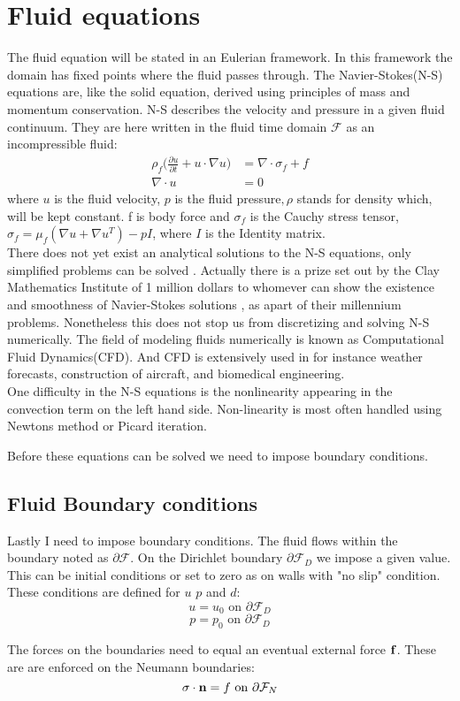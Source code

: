 
\section{Fluid equations}
The fluid equation will be stated in an Eulerian framework. In this framework the domain has fixed points where the fluid passes through. 
The Navier-Stokes(N-S) equations are, like the solid equation, derived using principles of mass and momentum conservation. N-S describes the velocity and pressure in a given fluid continuum. They are here written in the fluid time domain $\mathcal{F}$ as an incompressible fluid:
\begin{align}
\label{eq:NS}
\rho_f\big( \frac{\partial u}{\partial t} +  u \cdot \nabla u\big) &= \nabla \cdot \sigma_f + f  \\
\nabla \cdot u &= 0
\end{align}
where $u$ is the fluid velocity, $p$ is the fluid pressure$, \rho$ stands for density which, will be kept constant. f is body force and $\sigma_f$ is the Cauchy stress tensor, $ \sigma_f = \mu_f (\nabla u + \nabla u^T)  - pI$, where $I$ is the Identity matrix. \\

There does not yet exist an analytical solutions to the N-S equations, only simplified problems can be solved \cite{White2000}. Actually there is a prize set out by the Clay Mathematics Institute of 1 million dollars to whomever can show the existence and smoothness of Navier-Stokes solutions \cite{Fefferman2000}, as apart of their millennium problems. 
Nonetheless this does not stop us from discretizing and solving N-S numerically. The field of modeling fluids numerically is known as Computational Fluid Dynamics(CFD). And CFD is extensively used in for instance weather forecasts, construction of aircraft, and biomedical engineering.\\

One difficulty in the N-S equations is the nonlinearity appearing in the convection term on the left hand side. Non-linearity is most often handled using Newtons method or Picard iteration.

Before these equations can be solved we need to impose boundary conditions.
\subsection{Fluid Boundary conditions}
Lastly I need to impose boundary conditions. The fluid flows within the boundary noted as $ \partial \mathcal{F}$. On the Dirichlet boundary $ \partial \mathcal{F}_D$ we impose a given value. This can be initial conditions or set to zero as on walls with "no slip" condition. These conditions are defined for $u$ $p$ and $d$:
$$  u = u_0 \text{   on   } \partial \mathcal{F}_D  $$
$$  p = p_0 \text{   on   } \partial \mathcal{F}_D  $$

The forces on the boundaries need to equal an eventual external force $ \bold{f}$. These are are enforced on the Neumann boundaries:
$$ \sigma \cdot \bold{n} = f \text{   on   } \partial \mathcal{F}_N    $$







